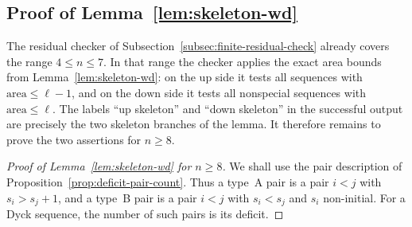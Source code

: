 \documentclass[11pt]{article}
\theoremstyle{plain}
\theoremstyle{definition}
\theoremstyle{remark}
\newcommand{\area}{\mathrm{area}}
\begin{document}
\subsection{Proof of Lemma~\ref{lem:skeleton-wd}}
\label{subsec:proof-skeleton-wd}
The residual checker of Subsection~\ref{subsec:finite-residual-check} already
covers the range \(4\le n\le 7\).  In that range the checker applies the
exact area bounds from Lemma~\ref{lem:skeleton-wd}: on the \(\mathrm{up}\)
side it tests all sequences with \(\area\le \ell-1\), and on the
\(\mathrm{down}\) side it tests all nonspecial sequences with
\(\area\le \ell\).  The labels ``up skeleton'' and ``down skeleton'' in the
successful output are precisely the two skeleton branches of the lemma.  It
therefore remains to prove the two assertions for \(n\ge 8\).
\begin{proof}[Proof of Lemma~\ref{lem:skeleton-wd} for \(n\ge 8\)]
We shall use the pair description of Proposition~\ref{prop:deficit-pair-count}.
Thus a type~A pair is a pair \(i<j\) with \(s_i>s_j+1\), and a type~B pair is
a pair \(i<j\) with \(s_i<s_j\) and \(s_i\) non-initial.  For a Dyck sequence,
the number of such pairs is its deficit.

\end{proof}
\end{document}
